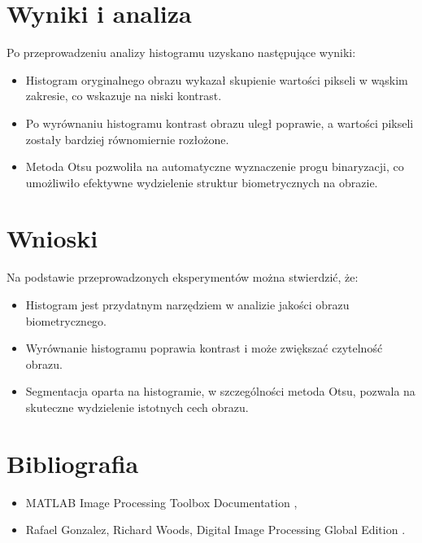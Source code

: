 \section{Wyniki i analiza}
Po przeprowadzeniu analizy histogramu uzyskano następujące wyniki:
\begin{itemize}
    \item Histogram oryginalnego obrazu wykazał skupienie wartości pikseli w wąskim zakresie, co wskazuje na niski kontrast.
    \item Po wyrównaniu histogramu kontrast obrazu uległ poprawie, a wartości pikseli zostały bardziej równomiernie rozłożone.
    \item Metoda Otsu pozwoliła na automatyczne wyznaczenie progu binaryzacji, co umożliwiło efektywne wydzielenie struktur biometrycznych na obrazie.
\end{itemize}

\section{Wnioski}
Na podstawie przeprowadzonych eksperymentów można stwierdzić, że:
\begin{itemize}
    \item Histogram jest przydatnym narzędziem w analizie jakości obrazu biometrycznego.
    \item Wyrównanie histogramu poprawia kontrast i może zwiększać czytelność obrazu.
    \item Segmentacja oparta na histogramie, w szczególności metoda Otsu, pozwala na skuteczne wydzielenie istotnych cech obrazu.
\end{itemize}

\section{Bibliografia}
\begin{itemize}
    \item MATLAB Image Processing Toolbox Documentation \cite{mathworks},
    \item Rafael Gonzalez, Richard Woods, Digital Image Processing Global Edition \cite{gonzalez2017}.
\end{itemize}
